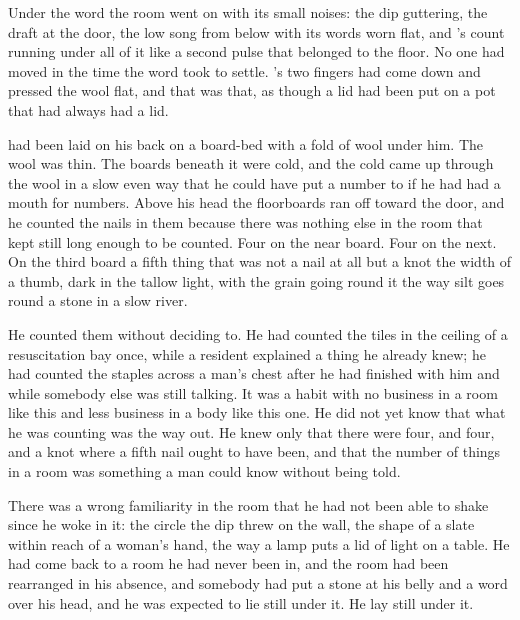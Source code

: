 Under the word the room went on with its small noises: the dip guttering, the draft at the door, the low song from below with its words worn flat, and 's count running under all of it like a second pulse that belonged to the floor. No one had moved in the time the word took to settle. 's two fingers had come down and pressed the wool flat, and that was that, as though a lid had been put on a pot that had always had a lid.

 had been laid on his back on a board-bed with a fold of wool under him. The wool was thin. The boards beneath it were cold, and the cold came up through the wool in a slow even way that he could have put a number to if he had had a mouth for numbers. Above his head the floorboards ran off toward the door, and he counted the nails in them because there was nothing else in the room that kept still long enough to be counted. Four on the near board. Four on the next. On the third board a fifth thing that was not a nail at all but a knot the width of a thumb, dark in the tallow light, with the grain going round it the way silt goes round a stone in a slow river.

He counted them without deciding to. He had counted the tiles in the ceiling of a resuscitation bay once, while a resident explained a thing he already knew; he had counted the staples across a man's chest after he had finished with him and while somebody else was still talking. It was a habit with no business in a room like this and less business in a body like this one. He did not yet know that what he was counting was the way out. He knew only that there were four, and four, and a knot where a fifth nail ought to have been, and that the number of things in a room was something a man could know without being told.

There was a wrong familiarity in the room that he had not been able to shake since he woke in it: the circle the dip threw on the wall, the shape of a slate within reach of a woman's hand, the way a lamp puts a lid of light on a table. He had come back to a room he had never been in, and the room had been rearranged in his absence, and somebody had put a stone at his belly and a word over his head, and he was expected to lie still under it. He lay still under it.

